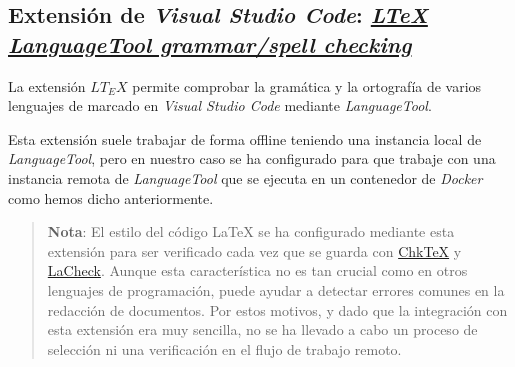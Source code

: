 \subsection{Extensión de \textit{Visual Studio Code}: \href{https://github.com/valentjn/vscode-ltex}{\textit{LTeX LanguageTool grammar/spell checking}}}

La extensión \( LT_E X \) permite comprobar la gramática y la ortografía de varios lenguajes de marcado en \textit{Visual Studio Code} mediante \textit{LanguageTool}.

Esta extensión suele trabajar de forma offline teniendo una instancia local de \textit{LanguageTool}, pero en nuestro caso se ha configurado para que trabaje con una instancia remota de \textit{LanguageTool} que se ejecuta en un contenedor de \textit{Docker} como hemos dicho anteriormente.

\begin{quote}
    \textbf{Nota}: El estilo del código \LaTeX{} se ha configurado mediante esta extensión para ser verificado cada vez que se guarda con \href{https://www.nongnu.org/chktex/}{ChkTeX} y \href{https://ctan.org/pkg/lacheck}{LaCheck}. Aunque esta característica no es tan crucial como en otros lenguajes de programación, puede ayudar a detectar errores comunes en la redacción de documentos. Por estos motivos, y dado que la integración con esta extensión era muy sencilla, no se ha llevado a cabo un proceso de selección ni una verificación en el flujo de trabajo remoto.
\end{quote}